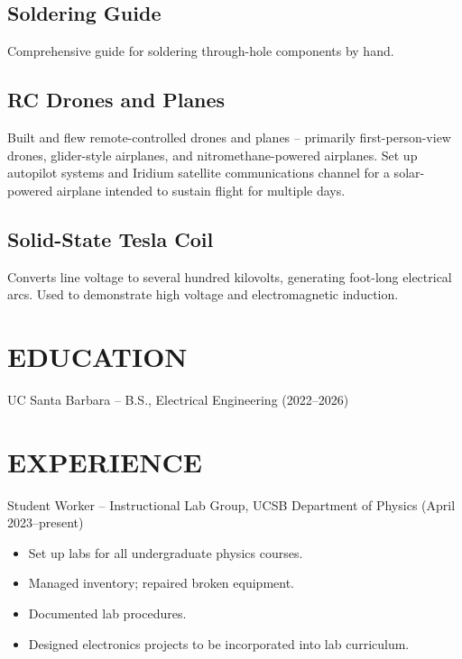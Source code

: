 	\subsection{Soldering Guide}
	Comprehensive guide for soldering through-hole components by hand.
	\subsection{RC Drones and Planes}
	Built and flew remote-controlled drones and planes – primarily first-person-view drones, glider-style airplanes, and nitromethane-powered airplanes. Set up autopilot systems and Iridium satellite communications channel for a solar-powered airplane intended to sustain flight for multiple days.
	\subsection{Solid-State Tesla Coil}
	Converts line voltage to several hundred kilovolts, generating foot-long electrical arcs. Used to demonstrate high voltage and electromagnetic induction.
	
	\section*{EDUCATION}
	UC Santa Barbara – B.S., Electrical Engineering (2022–2026)
	
	\section*{EXPERIENCE}
	Student Worker – Instructional Lab Group, UCSB Department of Physics (April 2023–present)
	\begin{itemize}
		\setlength \itemsep{0.1em}
		\item Set up labs for all undergraduate physics courses.
		\item Managed inventory; repaired broken equipment.
		\item Documented lab procedures.
		\item Designed electronics projects to be incorporated into lab curriculum.
	\end{itemize}


